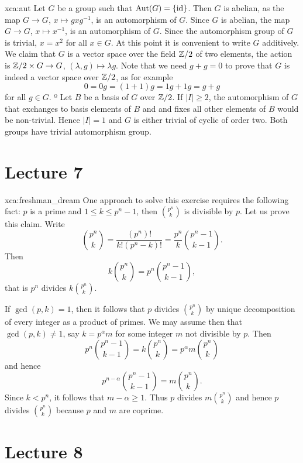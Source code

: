 \begin{sol}{xca:aut}
    Let $G$ be a group such that $\operatorname{Aut}(G)=\{\operatorname{id}\}$. 
    Then $G$ is abelian, as the map $G\to G$, $x\mapsto gxg^{-1}$,   
    is an automorphism of $G$. Since $G$ is abelian, 
    the map $G\to G$, $x\mapsto x^{-1}$, is an automorphism of $G$. Since 
    the automorphism group of $G$ is trivial, 
    $x=x^2$ for all $x\in G$. 
    At this point it is convenient to write $G$ additively. We claim that 
    $G$ is a vector space
    over the field $\mathbb{Z}/2$ of two elements, the action
    is $\mathbb{Z}/2\times G\to G$, $(\lambda,g)\mapsto \lambda g$. Note that
    we need $g+g=0$ to prove that $G$ is indeed a vector space over $\mathbb{Z}/2$, as for example
    \[
    0=0g=(1+1)g=1g+1g=g+g
    \]
    for all $g\in G$. º
    Let $B$ be   
    a basis of $G$ over $\mathbb{Z}/2$. If $|I|\geq 2$, 
    the automorphism of $G$ that exchanges to basis elements of $B$ and  
    and fixes all other elements of $B$ would be non-trivial. Hence $|I|=1$ and 
    $G$ is either trivial of cyclic of order two. Both groups have trivial
    automorphism group. 
\end{sol}

\section*{Lecture 7}

\begin{sol}{xca:freshman_dream}
    One approach to solve this exercise requires the following fact: 
    $p$ is a prime and $1\leq k\leq p^n-1$, then $\binom{p^n}{k}$ is divisible by $p$.
    Let us prove this claim. Write
    \[
    \binom{p^n}{k}=\frac{(p^n)!}{k!(p^n-k)!}=\frac{p^n}{k}\binom{p^n-1}{k-1}.
    \]
    Then
    \[
    k\binom{p^n}{k}=p^n\binom{p^n-1}{k-1},
    \]
    that is $p^n$ divides $k\binom{p^n}{k}$. 
    
    If $\gcd(p,k)=1$, then it follows that $p$ divides $\binom{p^n}{k}$ by unique decomposition
    of every integer as a product of primes. We may assume then that $\gcd(p,k)\ne1$, 
    say $k=p^\alpha m$ for some integer $m$ not divisible by $p$. Then
    \[
    p^n\binom{p^n-1}{k-1}=k\binom{p^n}{k}=p^{\alpha}m\binom{p^n}{k}
    \]
    and hence 
    \[
    p^{n-\alpha}\binom{p^n-1}{k-1}=m\binom{p^n}{k}.
    \]
    Since $k<p^n$, it follows that
    $m-\alpha\geq 1$. Thus $p$ divides $m\binom{p^n}{k}$ and hence
    $p$ divides $\binom{p^n}{k}$ because $p$ and $m$ are coprime. 
\end{sol}

\section*{Lecture 8}

